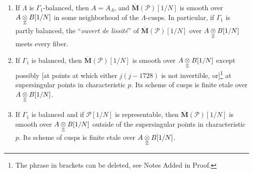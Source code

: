 \begin{kthm}
\begin{enumerate}[label=(\arabic*)]
\item If $\Lambda$ is $\Gamma_1$-balanced, then $A = A_\Lambda$, and $\overline{\mathbf{M}}(\mathcal{P})[1/N]$ is smooth over $A \underset{\mathbb{Z}}{\otimes} B[1/N]$ in some neighborhood of the $\Lambda$-cusps. In particular, if $\Gamma_1$ is partly balanced, the ``\emph{ouvert de lissit\'e}'' of $\overline{\mathbf{M}}(\mathcal{P})[1/N]$ over $A \underset{\mathbb{Z}}{\otimes} B[1/N]$ meets every fiber.
\item If $\Gamma_1$ is balanced, then $\overline{\mathbf{M}}(\mathcal{P})[1/N]$ is smooth over $A \underset{\mathbb{Z}}{\otimes} B[1/N]$ except possibly [at points at which either $j(j-1728)$ is not invertible, or]{\renewcommand{\thefootnote}{*}\footnote{The phrase in brackets can be deleted, see Notes Added in Proof.}} at supersingular points in characteristic $p$. Its scheme of cusps is finite etale over $A \underset{\mathbb{Z}}{\otimes} B[1/N]$.
\item If $\Gamma_1$ is balanced and if $\mathcal{P}[1/N]$ is representable, then $\overline{\mathbf{M}}(\mathcal{P})[1/N]$ is smooth over $A \underset{\mathbb{Z}}{\otimes} B[1/N]$ outside of the supersingular points in characteristic $p$. Its scheme of cusps is finite etale over $A \underset{\mathbb{Z}}{\otimes} B[1/N]$.
\end{enumerate}
\end{kthm}

